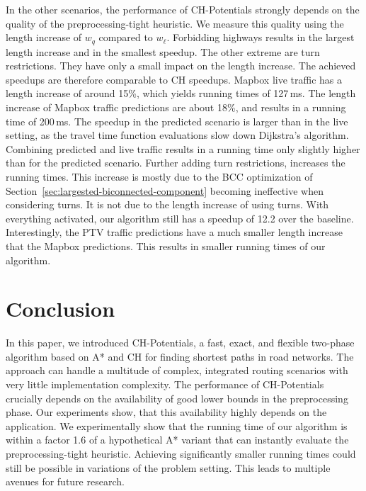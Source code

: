 \documentclass[letterpaper]{article} %
\begin{document}
In the other scenarios, the performance of CH-Potentials strongly depends on the quality of the preprocessing-tight heuristic.
We measure this quality using the length increase of $w_q$ compared to $w_\ell$.
Forbidding highways results in the largest length increase and in the smallest speedup.
The other extreme are turn restrictions.
They have only a small impact on the length increase.
The achieved speedups are therefore comparable to CH speedups.
%
Mapbox live traffic has a length increase of around 15\%, which yields running times of 127\,ms.
The length increase of Mapbox traffic predictions are about 18\%, and results in a running time of 200\,ms.
The speedup in the predicted scenario is larger than in the live setting, as the travel time function evaluations slow down Dijkstra's algorithm.
Combining predicted and live traffic results in a running time only slightly higher than for the predicted scenario.
Further adding turn restrictions, increases the running times.
This increase is mostly due to the BCC optimization of Section~\ref{sec:largested-biconnected-component} becoming ineffective when considering turns.
It is not due to the length increase of using turns.
With everything activated, our algorithm still has a speedup of 12.2 over the baseline.
Interestingly, the PTV traffic predictions have a much smaller length increase that the Mapbox predictions.
This results in smaller running times of our algorithm.

\section{Conclusion}
\label{sec:conclusion}

In this paper, we introduced CH-Potentials, a fast, exact, and flexible two-phase algorithm based on A* and CH for finding shortest paths in road networks.
The approach can handle a multitude of complex, integrated routing scenarios with very little implementation complexity.
The performance of CH-Potentials crucially depends on the availability of good lower bounds in the preprocessing phase.
Our experiments show, that this availability highly depends on the application.
We experimentally show that the running time of our algorithm is within a factor 1.6 of a hypothetical A* variant that can instantly evaluate the preprocessing-tight heuristic.
Achieving significantly smaller running times could still be possible in variations of the problem setting. %
This leads to multiple avenues for future research.
\end{document}
